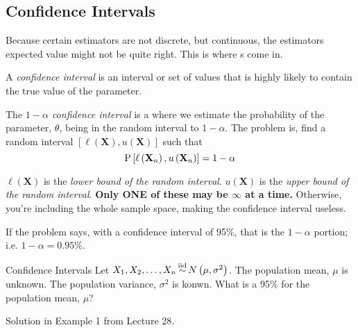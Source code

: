 \subsection{Confidence Intervals}\label{subsec:Confidence Interval}
Because certain estimators are not discrete, but continuous, the estimators expected value might not be quite right.
This is where s come in.
\begin{definition}\label{def:Confidence Interval}
  A \emph{confidence interval} is an interval or set of values that is highly likely to contain the true value of the parameter.
\end{definition}
\begin{definition}\label{def:1-alpha Confidence Interval}
  The \emph{$1-\alpha$ confidence interval} is a  where we estimate the probability of the parameter, $\theta$, being in the random interval to $1-\alpha$.
  The problem is, find a random interval $\left[ \ell \left( \mathbf{X} \right), u \left( \mathbf{X} \right) \right]$ such that
  \begin{equation}\label{eq:1-alpha Confidence Interval}
    \operatorname{\operatorname{P}} \left[ \ell \left( \mathbf{X}_{n} \right) , u \left( \mathbf{X}_{n} \right) \right] = 1-\alpha
  \end{equation}
  \begin{remark}
    $\ell \left( \mathbf{X} \right)$ is the \emph{lower bound of the random interval}.
    $u \left( \mathbf{X} \right)$ is the \emph{upper bound of the random interval}.
    \textbf{Only ONE of these may be $\infty$ at a time.} Otherwise, you're including the whole sample space, making the confidence interval useless.
  \end{remark}
  \begin{remark}
    If the problem says, with a confidence interval of 95\%, that is the $1-\alpha$ portion; i.e. $1-\alpha = 0.95 \%$.
  \end{remark}
\end{definition}
\begin{example}{Confidence Intervals}
  Let $X_{1}, X_{2}, \ldots, X_{n} \operatorname{\overset{\text{iid}}{\operatorname{\sim}}} N \left( \mu, \sigma^{2} \right)$.
  The population mean, $\mu$ is unknown.
  The population variance, $\sigma^{2}$ is konwn.
  What is a 95\%  for the population mean, $\mu$?

  \tcblower

  Solution in Example 1 from Lecture 28.
\end{example}


